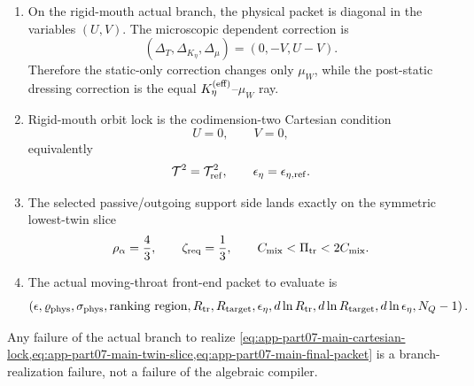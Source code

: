 \begin{theorem}
\begin{enumerate}[leftmargin=2.2em]
  \begin{equation}
  \label{eq:app-part07-main-prefactor-packet}
  \bigl(\Delta_{\rm norm},a_{P_0},b_{P_0}\bigr),
  \qquad
  b_{P_0}=3a_{P_0},
  \qquad
  \Xi_1=\frac{P_1}{P_0}.
  \end{equation}
  The robust one-scalar ceiling is
  \begin{equation}
  \label{eq:app-part07-main-xi-ceiling}
  \frac{\Delta_{\rm norm}+T_{\rm quad}}{\hat m_0^{\,2}}
  \bigl(1+|\varepsilon\Xi_1|\bigr)
  \le P_{\rm crit},
  \qquad
  T_{\rm quad}:=\frac{54Gc_s^5}{5a^5c^5}.
  \end{equation}
  \item On the rigid-mouth actual branch, the physical packet is diagonal in the variables \((U,V)\).  The microscopic dependent correction is
  \begin{equation}
  \label{eq:app-part07-main-dependent-correction}
  (\Delta_T,\Delta_{K_\eta},\Delta_\mu)=(0,-V,U-V).
  \end{equation}
  Therefore the static-only correction changes only \(\mu_W\), while the post-static dressing correction is the equal \(K_\eta^{(\rm eff)}\)--\(\mu_W\) ray.
  \item Rigid-mouth orbit lock is the codimension-two Cartesian condition
  \begin{equation}
  \label{eq:app-part07-main-cartesian-lock}
  U=0,
  \qquad
  V=0,
  \end{equation}
  equivalently
  \begin{equation}
  \label{eq:app-part07-main-cartesian-lock-physical}
  \mathcal T^2=\mathcal T_{\rm ref}^2,
  \qquad
  \epsilon_\eta=\epsilon_{\eta,\rm ref}.
  \end{equation}
  \item The selected passive/outgoing support side lands exactly on the symmetric lowest-twin slice
  \begin{equation}
  \label{eq:app-part07-main-twin-slice}
  \rho_\alpha=\frac43,
  \qquad
  \zeta_{\rm req}=\frac13,
  \qquad
  C_{\rm mix}<\Pi_{\rm tr}<2C_{\rm mix}.
  \end{equation}
  \item The actual moving-throat front-end packet to evaluate is
  \begin{equation}
  \label{eq:app-part07-main-final-packet}
  \left(
  \epsilon,
  \varrho_{\rm phys},
  \sigma_{\rm phys},
  \text{ranking region},
  R_{\rm tr},
  R_{\rm target},
  \epsilon_\eta,
  d\ln R_{\rm tr},
  d\ln R_{\rm target},
  d\ln\epsilon_\eta,
  N_Q-1
  \right).
  \end{equation}
\end{enumerate}
Any failure of the actual branch to realize \cref{eq:app-part07-main-cartesian-lock,eq:app-part07-main-twin-slice,eq:app-part07-main-final-packet} is a branch-realization failure, not a failure of the algebraic compiler.
\end{theorem}

